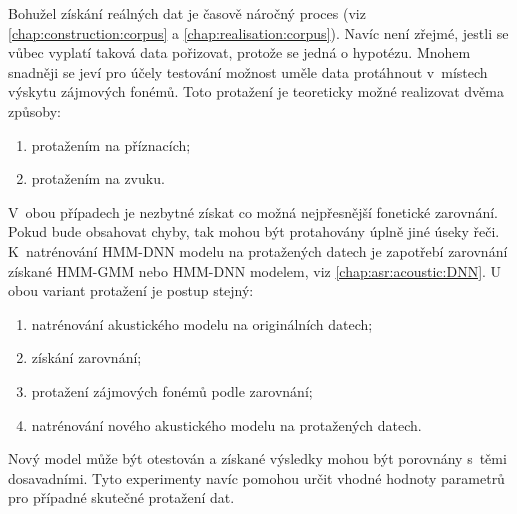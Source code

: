 
Bohužel získání reálných dat je časově náročný proces (viz \ref{chap:construction:corpus} a \ref{chap:realisation:corpus}).
Navíc není zřejmé, jestli se vůbec vyplatí taková data pořizovat, protože se jedná o hypotézu.
Mnohem snadněji se jeví pro účely testování možnost uměle data protáhnout v~místech výskytu zájmových fonémů.
Toto protažení je teoreticky možné realizovat dvěma způsoby:

\begin{enumerate}
  \item protažením na příznacích;
  \item protažením na zvuku.
\end{enumerate}

\noindent V~obou případech je nezbytné získat co možná nejpřesnější fonetické zarovnání. Pokud bude obsahovat chyby, tak mohou být protahovány úplně jiné úseky řeči. K~natrénování HMM-DNN modelu na protažených datech je zapotřebí zarovnání získané HMM-GMM nebo HMM-DNN modelem, viz \ref{chap:asr:acoustic:DNN}. U obou variant protažení je postup stejný:

\begin{enumerate}
  \item natrénování akustického modelu na originálních datech;
  \item získání zarovnání;
  \item protažení zájmových fonémů podle zarovnání;
  \item natrénování nového akustického modelu na protažených datech.
\end{enumerate}

\noindent Nový model může být otestován a získané výsledky mohou být porovnány s~těmi dosavadními.
Tyto experimenty navíc pomohou určit vhodné hodnoty parametrů pro případné skutečné protažení dat.

